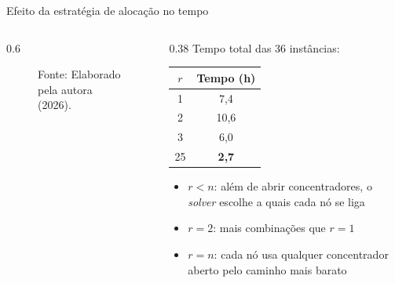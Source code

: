 \documentclass[aspectratio=169, 10pt]{beamer}
\newcommand{\fonte}[1]{{\scriptsize Fonte: #1\par}}
\begin{document}
\begin{frame}{Efeito da estratégia de alocação no tempo}
\begin{columns}[c]
\begin{column}{0.6\textwidth}
\begin{figure}
        \fonte{Elaborado pela autora (2026).}
      \end{figure}
    \end{column}
    \begin{column}{0.38\textwidth}
      \small
      Tempo total das 36 instâncias:
      \begin{center}
        \begin{tabular}{cc}
          \toprule
          $r$ & Tempo (h)\\
          \midrule
          1 & 7,4\\
          2 & \alert{10,6}\\
          3 & 6,0\\
          25 & \textbf{2,7}\\
          \bottomrule
        \end{tabular}
      \end{center}
      \scriptsize
      \begin{itemize}
        \item $r<n$: além de abrir concentradores, o \textit{solver} escolhe a quais cada nó se liga
        \item $r=2$: mais combinações que $r=1$
        \item $r=n$: cada nó usa qualquer concentrador aberto pelo caminho mais barato
      \end{itemize}
    \end{column}
  \end{columns}
\end{frame}
\end{document}
